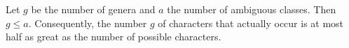 Let $g$ be the number of genera and $a$ the number of ambiguous classes. Then $g \leqslant a$. Consequently, the number $g$ of characters that actually occur is at most half as great as the number of possible characters.
